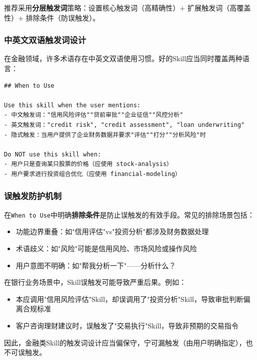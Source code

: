 推荐采用\textbf{分层触发词}策略：设置核心触发词（高精确性）+ 扩展触发词（高覆盖性）+ 排除条件（防误触发）。

\subsubsection{中英文双语触发词设计}

在金融领域，许多术语存在中英文双语使用习惯。好的Skill应当同时覆盖两种语言：

\begin{lstlisting}
## When to Use

Use this skill when the user mentions:
- 中文触发词："信用风险评估""贷前审批""企业征信""风控分析"
- 英文触发词："credit risk", "credit assessment", "loan underwriting"
- 隐式触发：当用户提供了企业财务数据并要求"评估""打分""分析风险"时

Do NOT use this skill when:
- 用户只是查询某只股票的价格（应使用 stock-analysis）
- 用户要求进行投资组合优化（应使用 financial-modeling）
\end{lstlisting}

\subsubsection{误触发防护机制}

在\texttt{When to Use}中明确\textbf{排除条件}是防止误触发的有效手段。常见的排除场景包括：
\begin{itemize}[leftmargin=2em]
  \item 功能边界重叠：如"信用评估"vs"投资分析"都涉及财务数据处理
  \item 术语歧义：如"风险"可能是信用风险、市场风险或操作风险
  \item 用户意图不明确：如"帮我分析一下"——分析什么？
\end{itemize}

\begin{warningbox}[误触发的真实风险]
在银行业务场景中，Skill误触发可能导致严重后果。例如：
\begin{itemize}[leftmargin=1em]
  \item 本应调用"信用风险评估"Skill，却误调用了"投资分析"Skill，导致审批判断偏离合规标准
  \item 客户咨询理财建议时，误触发了"交易执行"Skill，导致非预期的交易指令
\end{itemize}
因此，金融类Skill的触发词设计应当偏保守，宁可漏触发（由用户明确指定），也不可误触发。
\end{warningbox}

